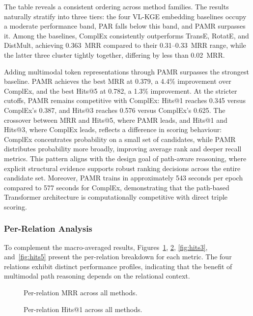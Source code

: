 \documentclass[runningheads]{llncs}
\begin{document}
The table reveals a consistent ordering across method
families. The results naturally stratify into three tiers: the four
VL-KGE embedding baselines occupy a moderate performance band, PAR
falls below this band, and PAMR surpasses it. Among the baselines,
ComplEx consistently outperforms TransE, RotatE, and DistMult,
achieving 0.363~MRR compared to their 0.31--0.33~MRR range, while the
latter three cluster tightly together, differing by less than
0.02~MRR.

Adding multimodal token representations through PAMR surpasses the
strongest baseline. PAMR achieves the best MRR at 0.379, a 4.4\%
improvement over ComplEx, and the best Hits@5 at 0.782, a 1.3\%
improvement. At the stricter cutoffs, PAMR remains competitive with
ComplEx: Hits@1 reaches 0.345 versus ComplEx's 0.387, and Hits@3
reaches 0.576 versus ComplEx's 0.625. The crossover between MRR and
Hits@5, where PAMR leads, and Hits@1 and Hits@3, where ComplEx leads,
reflects a difference in scoring behaviour: ComplEx concentrates
probability on a small set of candidates, while PAMR distributes
probability more broadly, improving average rank and deeper recall
metrics. This pattern aligns with the design goal of path-aware
reasoning, where explicit structural evidence supports robust ranking
decisions across the entire candidate set. Moreover, PAMR trains in
approximately 543 seconds per epoch compared to 577 seconds for
ComplEx, demonstrating that the path-based Transformer architecture is
computationally competitive with direct triple scoring.

\subsubsection{Per-Relation Analysis}

To complement the macro-averaged results, Figures~\ref{fig:mrr},
\ref{fig:hits1}, \ref{fig:hits3}, and~\ref{fig:hits5} present the
per-relation breakdown for each metric. The four relations exhibit
distinct performance profiles, indicating that the benefit of
multimodal path reasoning depends on the relational context.

\begin{figure}[t]
  \centering
  
  \caption{Per-relation MRR across all methods.}
  \label{fig:mrr}
\end{figure}

\begin{figure}[t]
  \centering
  
  \caption{Per-relation Hits@1 across all methods.}
  \label{fig:hits1}
\end{figure}
\end{document}
